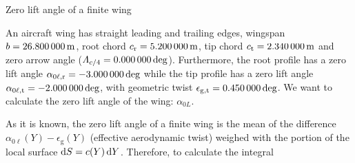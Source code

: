 \documentclass[[12pt,twoside]{book}
\begin{document}
%
\begin{myExampleX}{Zero lift angle of a finite wing}{}%
\label{example:Zero:Lift:Angle:Of:A:Finite:Wing}
%

%
An aircraft wing has straight leading and trailing edges, wingspan $b=\SI[round-precision=1]{\mySpanWingMT}{\metre}$,
root chord $c_\mathrm{r}=\SI[round-precision=2]{\myChordRootWingMT}{\metre}$,
tip chord $c_\mathrm{t}=\SI[round-precision=2]{\myChordTipWingMT}{\metre}$
and zero arrow angle ($\Lambda_{c/4}=\SI[round-precision=1]{\mySweepQuarterChordWingDEG}{\deg}$).
Furthermore, the root profile has a zero lift angle $\alpha_{0\ell,\mathrm{r}}=\SI[round-precision=1]{\myAlphaZeroLiftRootWingDEG}{\deg}$
while the tip profile has a zero lift angle
$\alpha_{0\ell,\mathrm{t}}=\SI[round-precision=1]{\myAlphaZeroLiftTipWingDEG}{\deg}$,
with geometric twist
$\epsilon_{\mathrm{g,t}}=\SI[round-precision=1]{\myTwistWingDEG}{\deg}$. We want to calculate the zero lift angle of the wing: $\alpha_{0L}$.

\medskip
As it is known, the zero lift angle of a finite wing is the mean of the difference $\alpha_{0\ell}(Y)-\epsilon_\mathrm{g}(Y)$ (effective aerodynamic twist) weighed with the portion of the local surface $\diff{S}=c(Y)\diff{Y}$. Therefore, to calculate the integral


\end{myExampleX}
\end{document}
